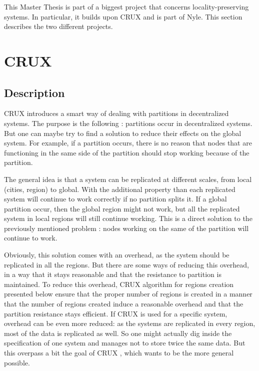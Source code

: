 \documentclass[a4paper,11pt,oneside]{report}
\begin{document}
This Master Thesis is part of a biggest project that concerns
locality-preserving systems. In particular, it builds upon
CRUX \cite{Basescu2014} and is part of Nyle. This section describes the two
different projects. 

\section{CRUX}

\subsection{Description}
CRUX \cite{Basescu2014} introduces a smart way of dealing with partitions in
decentralized systems. The purpose is the following : partitions occur in
decentralized systems. But one can maybe try to find a solution to reduce their
effects on the global system. For example, if a partition occurs, there is no
reason that nodes that are functioning in the same side of the partition should
stop working because of the partition. 

The general idea is that a system can be replicated at different scales, from
local (cities, region) to global.  With the additional property than each
replicated system will continue to work correctly if no partition splits it. If
a global partition occur, then the global region might not work, but all the
replicated system in local regions will still continue working. This is a
direct solution to the previously mentioned problem : nodes working on the same
of the partition will continue to work.

Obviously, this solution comes with an overhead, as the system should be
replicated in all the regions. But there are some ways of reducing this
overhead, in a way that it stays reasonable and that the resistance to
partition is maintained. To reduce this overhead, CRUX algorithm for regions
creation \cite{Basescu2014} presented below ensure that the proper number of
regions is created in a manner that the number of regions created induce a
reasonable overhead and that the partition resistance stays efficient. If CRUX
\cite{Basescu2014} is used for a specific system, overhead can be even more
reduced:  as the systems are replicated in every region, most of the data is
replicated as well. So one might actually dig inside the specification of one
system and manages not to store twice the same data. But this overpass a bit
the goal of CRUX \cite{Basescu2014}, which wants to be the more general
possible. 
\end{document}
